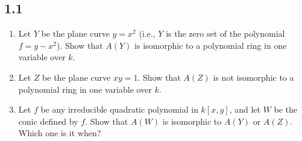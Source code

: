     \subsection*{1.1}

    \begin{enumerate}
        \item Let $Y$ be the plane curve $y = x^2$ (i.e., $Y$ is the zero set of the polynomial $f = y - x^2$). Show that $A(Y)$ is isomorphic to a polynomial ring in one variable over $k$.

        \item  Let $Z$ be the plane curve $xy = 1$. Show that $A(Z)$ is not isomorphic to a polynomial ring in one variable over $k$.

        \item Let $f$ be any irreducible quadratic polynomial in $k[x,y]$, and let $W$ be the conic defined by $f$. Show that $A(W)$ is isomorphic to $A(Y)$ or $A(Z)$. Which one is it when?


    \end{enumerate}
